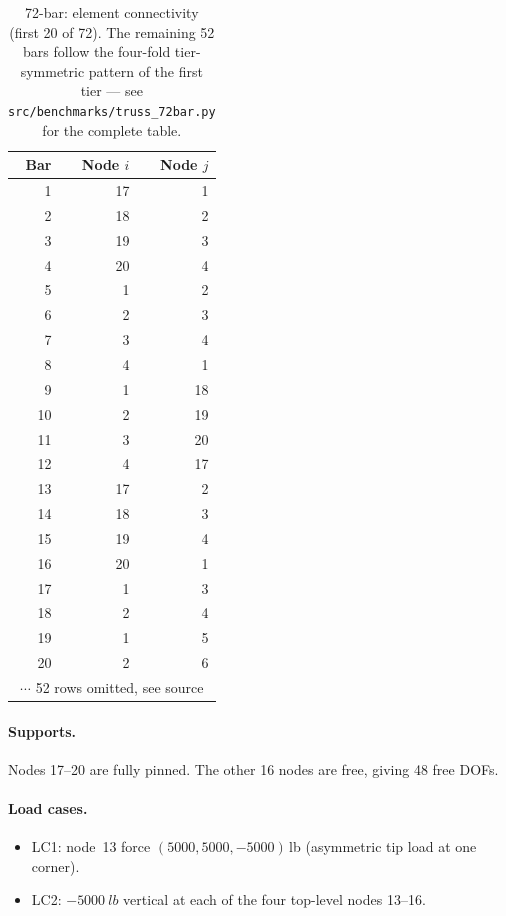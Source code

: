\begin{table}[h]
  \centering
  \small
  \caption{72-bar: element connectivity (first 20 of 72). The
    remaining 52 bars follow the four-fold tier-symmetric pattern
    of the first tier --- see \texttt{src/benchmarks/truss\_72bar.py}
    for the complete table.}
  \label{tab:geom:72bar:conn}
  \begin{tabular}{rrr}
  \toprule
  Bar & Node $i$ & Node $j$ \\
  \midrule
  1 & 17 & 1 \\ 2 & 18 & 2 \\ 3 & 19 & 3 \\ 4 & 20 & 4 \\
  5 & 1 & 2 \\ 6 & 2 & 3 \\ 7 & 3 & 4 \\ 8 & 4 & 1 \\
  9 & 1 & 18 \\ 10 & 2 & 19 \\ 11 & 3 & 20 \\ 12 & 4 & 17 \\
  13 & 17 & 2 \\ 14 & 18 & 3 \\ 15 & 19 & 4 \\ 16 & 20 & 1 \\
  17 & 1 & 3 \\ 18 & 2 & 4 \\ 19 & 1 & 5 \\ 20 & 2 & 6 \\
  \multicolumn{3}{c}{$\cdots$ 52 rows omitted, see source} \\
  \bottomrule
  \end{tabular}
\end{table}

\paragraph{Supports.} Nodes 17--20 are fully pinned. The other
16 nodes are free, giving 48 free DOFs.

\paragraph{Load cases.}
\begin{itemize}
  \item LC1: node~13 force $(5000,5000,-5000)$\,lb
    (asymmetric tip load at one corner).
  \item LC2: $-\SI{5000}{lb}$ vertical at each of the four
    top-level nodes 13--16.
\end{itemize}


